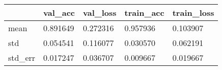 \begin{tabular}{|l|l|l|l|l|}
\toprule \hline
 & val\_acc & val\_loss & train\_acc & train\_loss \\ \hline
\midrule
mean & 0.891649 & 0.272316 & 0.957936 & 0.103907 \\ \hline
std & 0.054541 & 0.116077 & 0.030570 & 0.062191 \\ \hline
std\_err & 0.017247 & 0.036707 & 0.009667 & 0.019667 \\ \hline
\bottomrule
\end{tabular}

